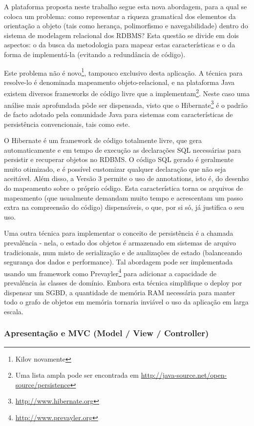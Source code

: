 \documentclass{abnt}
\begin{document}
A plataforma proposta neste trabalho segue esta nova abordagem, para a qual se coloca um problema: como representar a riqueza gramatical dos elementos da orientação a objeto (tais como herança, polimorfismo e navegabilidade) dentro do sistema de modelagem relacional dos RDBMS? Esta questão se divide em dois aspectos: o da busca da metodologia para mapear estas características e o da forma de implementá-la (evitando a redundância de código).

Este problema não é novo\footnote{Kilov novamente}, tampouco exclusivo desta aplicação. A técnica para resolve-lo é denominada mapeamento objeto-relacional, e na plataforma Java existem diversos frameworks de código livre que a implementam\footnote{Uma lista ampla pode ser encontrada em \url{http://java-source.net/open-source/persistence}}. Neste caso uma análise mais aprofundada pôde ser dispensada, visto que o Hibernate\footnote{\url{http://www.hibernate.org}} é o padrão de facto adotado pela comunidade Java para sistemas com características de persistência convencionais, tais como este.

O Hibernate é um framework de código totalmente livre, que gera automaticamente e em tempo de execução as declarações SQL necessárias para persistir e recuperar objetos no RDBMS. O código SQL gerado é geralmente muito otimizado, e é possível customizar qualquer declaração que não seja aceitável. Além disso, a Versão 3 permite o uso de annotations, isto é, do desenho do mapeamento sobre o próprio código. Esta característica torna os arquivos de mapeamento (que usualmente demandam muito tempo e acrescentam um passo extra na compreensão do código) dispensáveis, o que, por si só, já justifica o seu uso.

Uma outra técnica para implementar o conceito de persistência é a chamada prevalência - nela, o estado dos objetos é armazenado em sistemas de arquivo tradicionais, num misto de serialização e de aualizações de estado (balanceando segurança dos dados e performance). Tal abordagem pode ser implementada usando um framework como Prevayler\footnote{\url{http://www.prevayler.org}} para adicionar a capacidade de prevalência às classes de domínio. Embora esta técnica simplifique o deploy por dispensar um SGBD, a quantidade de memória RAM necessária para manter todo o grafo de objetos em memória tornaria inviável o uso da aplicação em larga escala.

\subsubsection{Apresentação e MVC (Model / View / Controller)}
\end{document}
